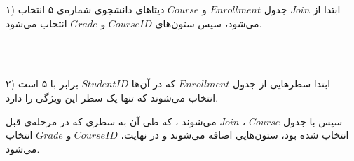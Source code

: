 \bigbreak

۱) ابتدا از 
$Join$
جدول
$Enrollment$
و
$Course$
دیتاهای دانشجوی شماره‌ی ۵ انتخاب می‌شود، سپس ستون‌های 
$CourseID$
و
$Grade$
انتخاب می‌شود.

\bigbreak
\\
\\

\begin{LTRbibitems}
\end{LTRbibitems}



۲)
ابتدا سطرهایی از جدول
$Enrollment$
که در آن‌ها
$StudentID$
برابر با ۵ است انتخاب می‌شوند که تنها یک سطر این ویژگی را دارد.

سپس
 با جدول
$Course$ 
،
$Join$
می‌شوند
،
که طی آن به سطری که در مرحله‌ی قبل انتخاب شده بود، ستون‌هایی اضافه می‌شوند و در نهایت،
$CourseID$
و
$Grade$
انتخاب می‌شود.

\bigbreak

\begin{LTRbibitems}
\end{LTRbibitems}






